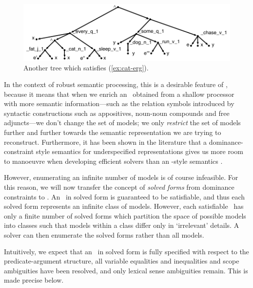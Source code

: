 \begin{figure}
  \centering
  \includegraphics[width=\columnwidth]{pic-more-stuff}
  \caption{Another tree which satisfies (\ref{ex:cat-erg}).}
  \label{fig:fat-black-cat}
\end{figure}

In the context of robust semantic processing, this is a desirable
feature of \rmrs, because it means that when we enrich an \rmrs\
obtained from a shallow processor with more semantic
information---such as the relation symbols introduced by
syntactic 
constructions such as appositives, noun-noun compounds and free
adjuncts---we don't change the set of models;
we only \emph{restrict} the set of models further and further towards
the semantic representation we are trying to reconstruct.
Furthermore, it has been shown in the literature that a
dominance-constraint style semantics for underspecified
representations gives us more room to manoeuvre when developing
efficient solvers than an \mrs-style semantics
\cite{Althaus_etal:JoA}.

However, enumerating an infinite number of models is of course
infeasible.  For this reason, we will now transfer the concept of
\emph{solved forms} from dominance constraints to \rmrs.  An \rmrs\ in
solved form is guaranteed to be satisfiable, and thus each solved form
represents an infinite class of models.  However, each satisfiable
\rmrs\ has only a finite number of solved forms which partition the
space of possible models into classes such that models within a class
differ only in `irrelevant' details.  A solver can then enumerate the
solved forms 
rather than all models.

Intuitively, we expect that an \rmrs\ in solved form is fully
specified with respect to the predicate-argument structure, all
variable equalities and inequalities and scope ambiguities have been
resolved, and only lexical sense ambiguities remain.  This is made
precise below.

